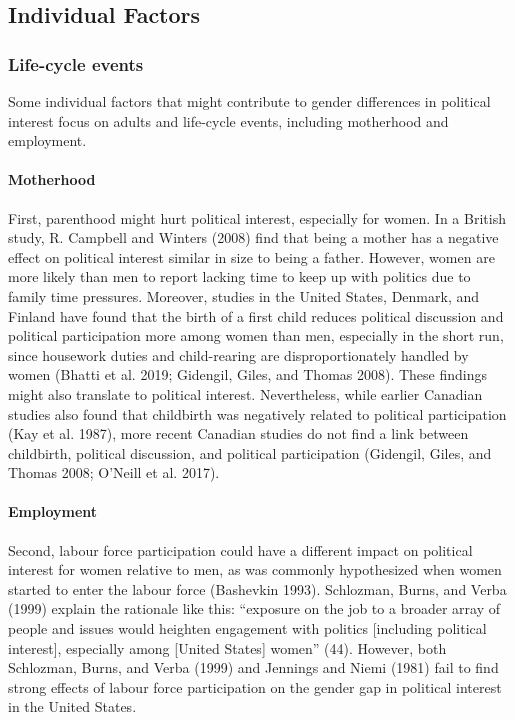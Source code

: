 \documentclass[
  letterpaper,
  DIV=11,
  numbers=noendperiod]{scrreprt}
\let\oldparagraph\paragraph
\renewcommand{\paragraph}[1]{\oldparagraph{#1}\mbox{}}
\begin{document}
\subsection{Individual Factors}\label{individual-factors}

\subsubsection{Life-cycle events}\label{life-cycle-events}

Some individual factors that might contribute to gender differences in
political interest focus on adults and life-cycle events, including
motherhood and employment.

\paragraph{Motherhood}\label{motherhood}

First, parenthood might hurt political interest, especially for women.
In a British study, R. Campbell and Winters (2008) find that being a
mother has a negative effect on political interest similar in size to
being a father. However, women are more likely than men to report
lacking time to keep up with politics due to family time pressures.
Moreover, studies in the United States, Denmark, and Finland have found
that the birth of a first child reduces political discussion and
political participation more among women than men, especially in the
short run, since housework duties and child-rearing are
disproportionately handled by women (Bhatti et al. 2019; Gidengil,
Giles, and Thomas 2008). These findings might also translate to
political interest. Nevertheless, while earlier Canadian studies also
found that childbirth was negatively related to political participation
(Kay et al. 1987), more recent Canadian studies do not find a link
between childbirth, political discussion, and political participation
(Gidengil, Giles, and Thomas 2008; O'Neill et al. 2017).

\paragraph{Employment}\label{employment}

Second, labour force participation could have a different impact on
political interest for women relative to men, as was commonly
hypothesized when women started to enter the labour force (Bashevkin
1993). Schlozman, Burns, and Verba (1999) explain the rationale like
this: ``exposure on the job to a broader array of people and issues
would heighten engagement with politics {[}including political
interest{]}, especially among {[}United States{]} women'' (44). However,
both Schlozman, Burns, and Verba (1999) and Jennings and Niemi (1981)
fail to find strong effects of labour force participation on the gender
gap in political interest in the United States.
\end{document}

